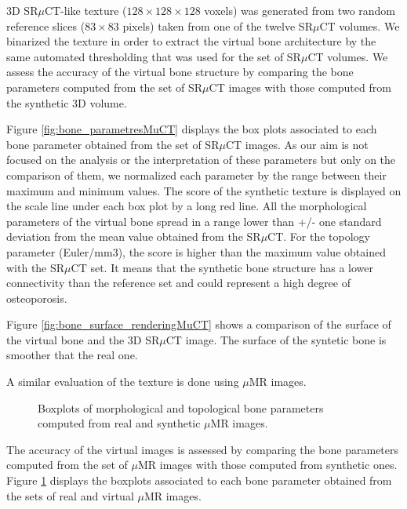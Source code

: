 3D SR$\mu$CT-like texture ($128 \times 128 \times 128$ voxels) was generated from two random 
reference slices ($83 \times 83$ pixels) taken from one of the twelve SR$\mu$CT volumes.  
We binarized the texture in order to extract the virtual bone architecture by the same automated 
thresholding that was used for the set of SR$\mu$CT volumes. 
We assess the accuracy of the virtual bone structure by comparing the bone parameters computed 
from the set of SR$\mu$CT images with those computed from the synthetic 3D volume.

Figure \ref{fig:bone_parametresMuCT} displays the box plots associated to each bone parameter obtained 
from the set of SR$\mu$CT images. As our aim is not focused on the analysis or 
the interpretation of these parameters but only on the comparison of them, 
we normalized each parameter by the range between their maximum and minimum values. 
The score of the synthetic texture is displayed on the scale line under each box plot by a 
long red line. All the morphological parameters of the
virtual bone spread in a range lower than +/- one standard deviation from the mean 
value obtained from the SR$\mu$CT. 
For the topology parameter (Euler/mm3), the score is higher than the maximum value 
obtained with the SR$\mu$CT set. It means that the synthetic bone 
structure has a lower connectivity than the reference set and could represent a high degree of osteoporosis.  

Figure \ref{fig:bone_surface_renderingMuCT} shows a comparison of the surface of the virtual bone and 
the 3D SR$\mu$CT image.
The surface of the syntetic bone is smoother that the real one.

A similar evaluation of the texture is done using $\mu$MR images.

\begin{figure}[h!]
 \centering 
\caption[Morphological evaluation of $\mu$MR texture.]{Boxplots of morphological and topological bone parameters computed from real and synthetic $\mu$MR images.}
 \label{fig:bone_parametresMuMR}
\end{figure}

The accuracy of the virtual images is assessed by comparing the bone parameters computed from the set of 
$\mu$MR images with those computed from synthetic ones.
Figure \ref{fig:bone_parametresMuMR} displays the boxplots associated to each bone parameter obtained from the sets of real 
and virtual $\mu$MR images. 

